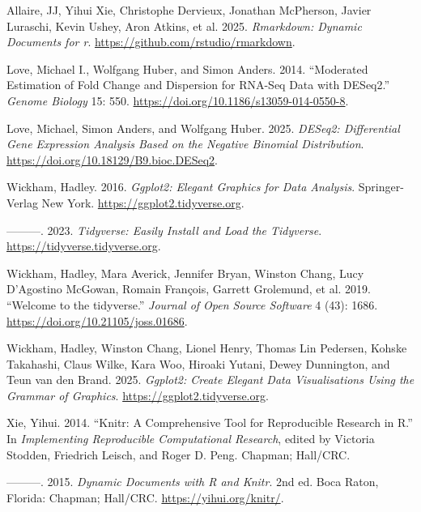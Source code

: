 \documentclass[
  11pt,
]{article}
\newlength{\cslhangindent}
\newenvironment{CSLReferences}[2] %
 {\begin{list}{}{%
  \setlength{\itemindent}{0pt}
  \setlength{\leftmargin}{0pt}
  \setlength{\parsep}{0pt}
  \ifodd #1
   \setlength{\leftmargin}{\cslhangindent}
   \setlength{\itemindent}{-1\cslhangindent}
  \fi
  \setlength{\itemsep}{#2\baselineskip}}}
 {\end{list}}
\begin{document}
\label{refs}
\begin{CSLReferences}{1}{0}
Allaire, JJ, Yihui Xie, Christophe Dervieux, Jonathan McPherson, Javier
Luraschi, Kevin Ushey, Aron Atkins, et al. 2025. \emph{Rmarkdown:
Dynamic Documents for r}. \url{https://github.com/rstudio/rmarkdown}.

Love, Michael I., Wolfgang Huber, and Simon Anders. 2014. {``Moderated
Estimation of Fold Change and Dispersion for RNA-Seq Data with
DESeq2.''} \emph{Genome Biology} 15: 550.
\url{https://doi.org/10.1186/s13059-014-0550-8}.

Love, Michael, Simon Anders, and Wolfgang Huber. 2025. \emph{DESeq2:
Differential Gene Expression Analysis Based on the Negative Binomial
Distribution}. \url{https://doi.org/10.18129/B9.bioc.DESeq2}.

Wickham, Hadley. 2016. \emph{Ggplot2: Elegant Graphics for Data
Analysis}. Springer-Verlag New York.
\url{https://ggplot2.tidyverse.org}.

---------. 2023. \emph{Tidyverse: Easily Install and Load the
Tidyverse}. \url{https://tidyverse.tidyverse.org}.

Wickham, Hadley, Mara Averick, Jennifer Bryan, Winston Chang, Lucy
D'Agostino McGowan, Romain François, Garrett Grolemund, et al. 2019.
{``Welcome to the {tidyverse}.''} \emph{Journal of Open Source Software}
4 (43): 1686. \url{https://doi.org/10.21105/joss.01686}.

Wickham, Hadley, Winston Chang, Lionel Henry, Thomas Lin Pedersen,
Kohske Takahashi, Claus Wilke, Kara Woo, Hiroaki Yutani, Dewey
Dunnington, and Teun van den Brand. 2025. \emph{Ggplot2: Create Elegant
Data Visualisations Using the Grammar of Graphics}.
\url{https://ggplot2.tidyverse.org}.

Xie, Yihui. 2014. {``Knitr: A Comprehensive Tool for Reproducible
Research in {R}.''} In \emph{Implementing Reproducible Computational
Research}, edited by Victoria Stodden, Friedrich Leisch, and Roger D.
Peng. Chapman; Hall/CRC.

---------. 2015. \emph{Dynamic Documents with {R} and Knitr}. 2nd ed.
Boca Raton, Florida: Chapman; Hall/CRC. \url{https://yihui.org/knitr/}.


\end{CSLReferences}
\end{document}
